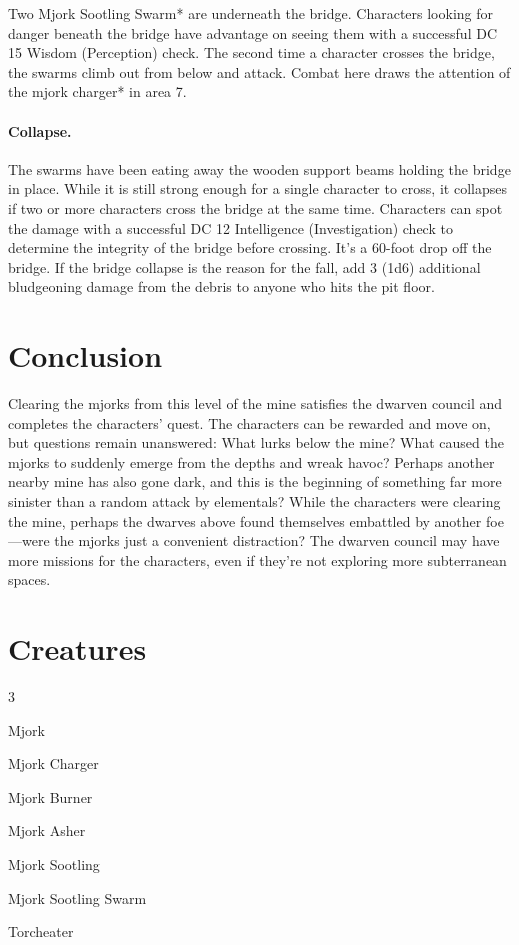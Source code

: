 \documentclass[10pt,a4paper,twoside,twocolumn,openany,bg=print,nodeprecatedcode]{dndbook}
\begin{document}
Two Mjork Sootling Swarm* are underneath the bridge. Characters looking for danger beneath the bridge have advantage on seeing them with a successful DC 15 Wisdom (Perception) check. The second time a character crosses the bridge, the swarms climb out from below and attack. Combat here draws the attention of the mjork charger* in area 7.
\paragraph{Collapse.}
The swarms have been eating away the wooden support beams holding the bridge in place. While it is still strong enough for a single character to cross, it collapses if two or more characters cross the bridge at the same time. Characters can spot the damage with a successful DC 12 Intelligence (Investigation) check to determine the integrity of the bridge before crossing. It's a 60-foot drop off the bridge. If the bridge collapse is the reason for the fall, add 3 (1d6) additional bludgeoning damage from the debris to anyone who hits the pit floor.
\section{Conclusion}
Clearing the mjorks from this level of the mine satisfies the dwarven council and completes the characters' quest. The characters can be rewarded and move on, but questions remain unanswered: What lurks below the mine? What caused the mjorks to suddenly emerge from the depths and wreak havoc? Perhaps another nearby mine has also gone dark, and this is the beginning of something far more sinister than a random attack by elementals? While the characters were clearing the mine, perhaps the dwarves above found themselves embattled by another foe—were the mjorks just a convenient distraction? The dwarven council may have more missions for the characters, even if they're not exploring more subterranean spaces.
\section{Creatures}

\begin{itemize}
\begin{multicols}{3}
\item Mjork
\item Mjork Charger
\item Mjork Burner
\item Mjork Asher
\item Mjork Sootling
\item Mjork Sootling Swarm
\item Torcheater
\end{multicols}

\end{itemize}
\end{document}
